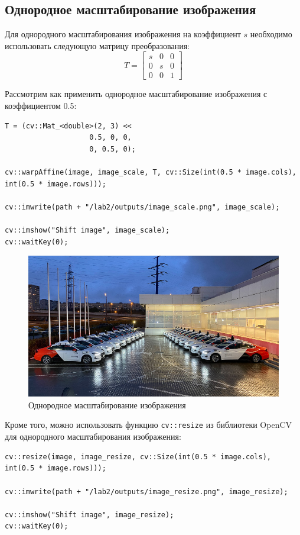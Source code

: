 \subsection{Однородное масштабирование изображения}

Для однородного масштабирования изображения на коэффициент $s$ необходимо использовать следующую матрицу преобразования:
\begin{equation}
T = \begin{bmatrix}
    s & 0 & 0 \\
    0 & s & 0 \\
    0 & 0 & 1
\end{bmatrix}
\end{equation}

Рассмотрим как применить однородное масштабирование изображения с коэффициентом 0.5:
\begin{lstlisting}[style=cpp_white, caption={Исходный код для однородного масштабирования изображения}]
T = (cv::Mat_<double>(2, 3) << 
                    0.5, 0, 0, 
                    0, 0.5, 0); 

cv::warpAffine(image, image_scale, T, cv::Size(int(0.5 * image.cols), int(0.5 * image.rows))); 

cv::imwrite(path + "/lab2/outputs/image_scale.png", image_scale);

cv::imshow("Shift image", image_scale); 
cv::waitKey(0);
\end{lstlisting}

\begin{figure}[ht]
    \includegraphics[width=\textwidth]{../outputs/image_scale.png}
    \caption{Однородное масштабирование изображения}
    \label{fig:uniform_scale_image}
\end{figure}

Кроме того, можно использовать функцию \texttt{cv::resize} из библиотеки OpenCV для однородного масштабирования изображения:
\begin{lstlisting}[style=cpp_white, caption={Исходный код для однородного масштабирования изображения с использованием библиотеки OpenCV}]
cv::resize(image, image_resize, cv::Size(int(0.5 * image.cols), int(0.5 * image.rows)));

cv::imwrite(path + "/lab2/outputs/image_resize.png", image_resize);

cv::imshow("Shift image", image_resize); 
cv::waitKey(0); 
\end{lstlisting}

